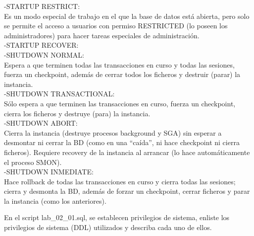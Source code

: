     -STARTUP RESTRICT:\\
    Es un modo especial de trabajo en el que la base de datos está abierta, pero solo se permite el acceso a usuarios 
    con permiso RESTRICTED (lo poseen los administradores) para hacer tareas especiales de administración.\\
    
    -STARTUP RECOVER:\\
    
    
    -SHUTDOWN NORMAL:\\
    Espera a que terminen todas las transacciones en curso y todas las sesiones, 
    fuerza un checkpoint, además de cerrar todos los ficheros y destruir (parar) la instancia.\\
    
    -SHUTDOWN TRANSACTIONAL:\\
    Sólo espera a que terminen las transacciones en curso, fuerza un checkpoint, cierra los ficheros y destruye (para) la instancia.\\
    
    -SHUTDOWN ABORT:\\
     Cierra la instancia (destruye procesos background y SGA) sin esperar a desmontar ni cerrar la BD (como en una “caída”, ni hace checkpoint ni cierra ficheros). Requiere recovery de la instancia al arrancar (lo hace automáticamente el proceso SMON).\\

    -SHUTDOWN INMEDIATE:\\
    Hace rollback de todas las transacciones en curso y cierra todas las sesiones; cierra y desmonta la BD, además de forzar un checkpoint, cerrar ficheros y parar la instancia (como los anteriores).\\
    
   \item En el script lab_02_01.sql, se establecen privilegios de sistema, enliste los privilegios de sistema (DDL) 
   utilizados y describa cada uno de ellos.\\
   
